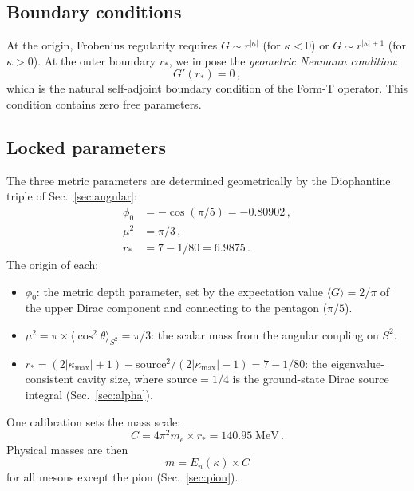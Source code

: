 \documentclass[aps,prd,twocolumn,superscriptaddress,nofootinbib,longbibliography]{revtex4-2}
\newcommand{\rstar}{r_{*}}
\newcommand{\phiz}{\phi_0}
\newcommand{\kmax}{|\kappa_{\mathrm{max}}|}
\begin{document}
\subsection{Boundary conditions}

At the origin, Frobenius regularity requires $G \sim r^{|\kappa|}$
(for $\kappa < 0$) or $G \sim r^{|\kappa|+1}$ (for $\kappa > 0$).
At the outer boundary $\rstar$, we impose the \emph{geometric Neumann
condition}:
\begin{equation}\label{eq:neumann}
  G'(\rstar) = 0\,,
\end{equation}
which is the natural self-adjoint boundary condition of the Form-T
operator.  This condition contains zero free parameters.

\subsection{Locked parameters}\label{sec:params}

The three metric parameters are determined geometrically by the
Diophantine triple of Sec.~\ref{sec:angular}:
\begin{align}
  \phiz &= -\cos(\pi/5) = -0.80902\,, \label{eq:phi0}\\
  \mu^2 &= \pi/3\,, \label{eq:mu2}\\
  \rstar &= 7 - 1/80 = 6.9875\,. \label{eq:rstar}
\end{align}
The origin of each:
\begin{itemize}
\item $\phiz$: the metric depth parameter, set by the expectation
  value $\langle G \rangle = 2/\pi$ of the upper Dirac component and
  connecting to the pentagon ($\pi/5$).
\item $\mu^2 = \pi \times \langle\cos^2\theta\rangle_{S^2} = \pi/3$:
  the scalar mass from the angular coupling on $S^2$.
\item $\rstar = (2\kmax + 1) - \mathrm{source}^2/(2\kmax - 1)
  = 7 - 1/80$: the eigenvalue-consistent cavity size, where
  $\mathrm{source} = 1/4$ is the ground-state Dirac source integral
  (Sec.~\ref{sec:alpha}).
\end{itemize}
One calibration sets the mass scale:
\begin{equation}\label{eq:C}
  C = 4\pi^2 m_e \times \rstar = 140.95\;\mathrm{MeV}\,.
\end{equation}
Physical masses are then
\begin{equation}\label{eq:massformula}
  m = E_n(\kappa) \times C
\end{equation}
for all mesons except the pion (Sec.~\ref{sec:pion}).
\end{document}
